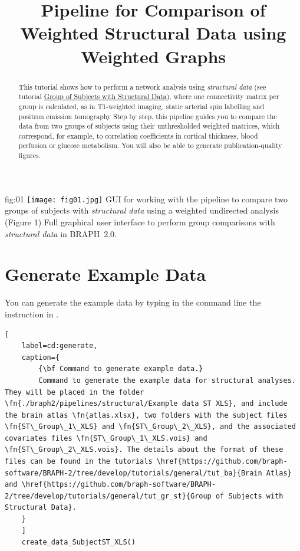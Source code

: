 \documentclass[justified]{tufte-handout}
\title[Comparison of Structural Data using WU]{Pipeline for Comparison of Weighted Structural Data using Weighted Graphs}
\begin{document}
\maketitle

\begin{abstract}
\noindent
This tutorial shows how to perform a network analysis using \emph{structural data} (see tutorial \href{https://github.com/braph-software/BRAPH-2/tree/develop/tutorials/general/tut_gr_st}{Group of Subjects with Structural Data}), where one connectivity matrix per group is calculated, as in T1-weighted imaging, static arterial spin labelling and positron emission tomography Step by step, this pipeline guides you to compare the data from two groups of subjects using their unthresholded weighted matrices, which correspond, for example, to correlation coefficients in cortical thickness, blood perfusion or glucose metabolism. You will also be able to generate publication-quality figures.
\end{abstract}
\tableofcontents

	{fig:01}
	{\texttt{[image: fig01.jpg]}}
	{GUI for working with the pipeline to compare two groups of subjects with \emph{structural data} using a weighted undirected analysis (Figure 1)}
	{
	Full graphical user interface to perform group comparisons with \emph{structural data} in BRAPH~2.0. 
	}

\clearpage

\section{Generate Example Data}

You can generate the example data by typing in the command line the instruction in .
%
\begin{lstlisting}[
	label=cd:generate,
	caption={
		{\bf Command to generate example data.}
		Command to generate the example data for structural analyses. They will be placed in the folder \fn{./braph2/pipelines/structural/Example data ST XLS}, and include the brain atlas \fn{atlas.xlsx}, two folders with the subject files \fn{ST\_Group\_1\_XLS} and \fn{ST\_Group\_2\_XLS}, and the associated covariates files \fn{ST\_Group\_1\_XLS.vois} and \fn{ST\_Group\_2\_XLS.vois}. The details about the format of these files can be found in the tutorials \href{https://github.com/braph-software/BRAPH-2/tree/develop/tutorials/general/tut_ba}{Brain Atlas} and \href{https://github.com/braph-software/BRAPH-2/tree/develop/tutorials/general/tut_gr_st}{Group of Subjects with Structural Data}.
	}
	]
	create_data_SubjectST_XLS()
\end{lstlisting}
\end{document}
